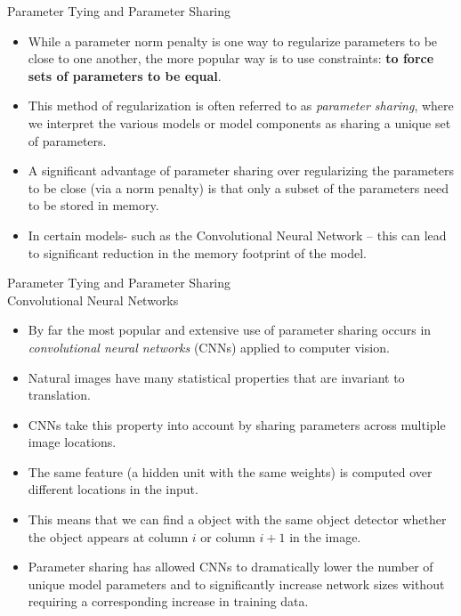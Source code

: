 \documentclass[10pt]{beamer}
\begin{document}
	\begin{frame}{Parameter Tying and Parameter Sharing}
		\begin{itemize}
			\item While a parameter norm penalty is one way to regularize parameters to be close to one another, the more popular way is to use constraints: \textbf{to force sets of parameters to be equal}. 
			\pause
			\item This method of regularization is often referred to as \emph{parameter sharing}, where we interpret the various models or model components as sharing a unique set of parameters.
			\pause
			\item A significant advantage of parameter sharing over regularizing the parameters to be close (via a norm penalty) is that only a subset of the parameters need to be stored in memory.
			\pause
			\item In certain models- such as the Convolutional Neural Network -- this can lead to significant reduction in the memory footprint of the model.
		\end{itemize}
	\end{frame}
	
	\begin{frame}{Parameter Tying and Parameter Sharing\\ Convolutional Neural Networks}
		\begin{itemize}
			\pause
			\item By far the most popular and extensive use of parameter sharing occurs in \emph{convolutional neural networks} (CNNs) applied to computer vision.
			\pause
			\item Natural images have many statistical properties that are invariant to translation.
			\pause
			\item CNNs take this property into account by sharing parameters across multiple image locations.
			\pause
			\item The same feature (a hidden unit with the same weights) is computed over different locations in the input. 
			\pause
			\item This means that we can find a object with the same object detector whether the object appears at column $i$ or column $i+1$ in the image.
			\pause
			\item Parameter sharing has allowed CNNs to dramatically lower the number of unique model parameters and to significantly increase network sizes without requiring a corresponding increase in training data.
		\end{itemize}
	\end{frame}
\end{document}
